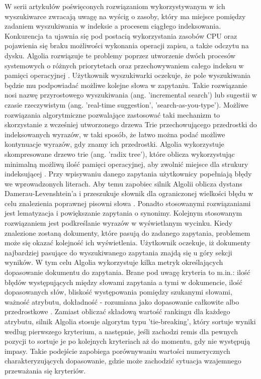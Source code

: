 W serii artykułów poświęconych rozwiązaniom
wykorzystywanym w ich wyszukiwarce zwracają uwagę na wyścig o zasoby, który ma miejsce
pomiędzy zadaniem wyszukiwania w indeksie a procesem ciągłego indeksowania. Konkurencja ta ujawnia się pod postacią wykorzystania zasobów CPU oraz pojawienia się braku
możliwości wykonania operacji zapisu, a także odczytu na dysku. Algolia rozwiązuje te problemy poprzez
utworzenie dwóch procesów systemowych o różnych priorytetach oraz przechowywaniem całego
indeksu w pamięci operacyjnej \autocite[a]{insidealgoliapart-a}. Użytkownik wyszukiwarki oczekuje, że pole wyszukiwania
będzie mu podpowiadać możliwe kolejne słowa w zapytaniu. Takie rozwiązanie nosi nazwę
przyrostowego wyszukiwania (ang. 'incremental search') lub sugestii w czasie rzeczywistym (ang. 'real-time suggestion', 'search-as-you-type').
Możliwe rozwiązania algorytmiczne pozwalające zastosować taki mechanizm to skorzystanie z
wcześniej utworzonego drzewa Trie przechowującego przedrostki do indeksowanych wyrazów, w taki
sposób, że łatwo można podać możliwe kontynuacje wyrazów, gdy znamy ich przedrostki. Algolia wykorzystuje
skompresowane drzewo trie (ang. 'radix tree'), które oblicza wykorzystując minimalną możliwą ilość
pamięci operacyjnej, aby zwolnić miejsce dla strukury indeksującej \autocite{insidealgoliapart-b}. Przy wpisywaniu danego
zapytania użytkownicy popełniają błędy we wprowadzonych literach. Aby temu zapobiec silnik Algolii
oblicza dystans Damerau-Levenshtein'a i przeszukuje słownik dla ograniczonej wielkości błędu w celu znalezienia poprawnej pisowni słowa \autocite
{insidealgoliapart-c}. Ponadto stosowanymi rozwiązaniami jest lematyzacja i
powiększanie zapytania o synonimy. Kolejnym stosowanym rozwiązaniem jest podkreślanie wyrazów
w wyświetlanym wycinku.
Kiedy znalezione zostaną dokumenty, które pasują do zadanego zapytania, problemem może
się okazać kolejność ich wyświetlenia. Użytkownik oczekuje, iż dokumenty najbardziej pasujące do
wyszukiwanego zapytania znajdą się u góry sekcji wyników. W tym celu Algolia wykorzystuje kilka metryk
określających dopasowanie dokumentu do zapytania. Brane pod uwagę kryteria to m.in.: ilość błędów występujących
między słowami zapytania a tymi w dokumencie, ilość dopasowanych słów, bliskość występowania
pomiędzy szukanymi słowami, ważność atrybutu, dokładność - rozumiana jako dopasowanie całkowite
albo przedrostkowe \autocite{insidealgoliapart-d}. Zamiast obliczać składową wartość rankingu dla każdego atrybutu, silnik Algolia
stosuje algorytm typu 'tie-breaking', który sortuje wyniki według pierwszego kryterium, a następnie, jeśli
zachodzi remis dla pewnych pozycji to sortuje je po kolejnych kryteriach aż do momentu, gdy nie
występują impasy. Takie podejście zapobiega porównywaniu wartości numerycznych charakteryzujących dopasowanie, gdzie
może zachodzić sytuacja wzajemnego przeważania się kryteriów.

